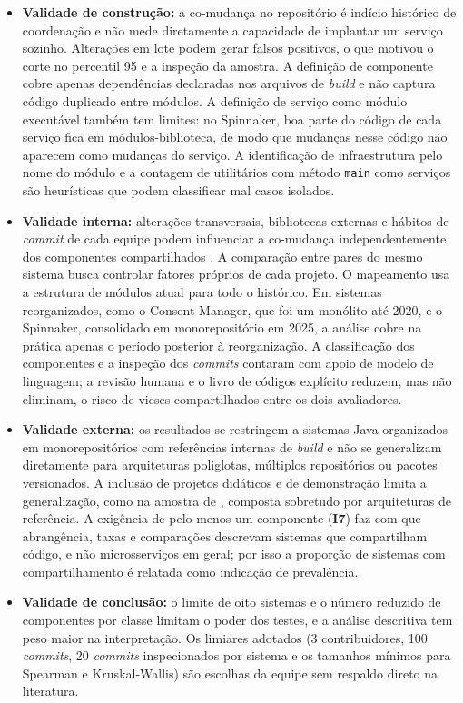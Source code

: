 \begin{itemize}
    \item \textbf{Validade de construção:} a co-mudança no repositório é indício histórico de coordenação e não mede diretamente a capacidade de implantar um serviço sozinho. Alterações em lote podem gerar falsos positivos, o que motivou o corte no percentil 95 e a inspeção da amostra. A definição de componente cobre apenas dependências declaradas nos arquivos de \textit{build} e não captura código duplicado entre módulos. A definição de serviço como módulo executável também tem limites: no Spinnaker, boa parte do código de cada serviço fica em módulos-biblioteca, de modo que mudanças nesse código não aparecem como mudanças do serviço. A identificação de infraestrutura pelo nome do módulo e a contagem de utilitários com método \texttt{main} como serviços são heurísticas que podem classificar mal casos isolados.
    \item \textbf{Validade interna:} alterações transversais, bibliotecas externas e hábitos de \textit{commit} de cada equipe podem influenciar a co-mudança independentemente dos componentes compartilhados \cite{assuncao2023}. A comparação entre pares do mesmo sistema busca controlar fatores próprios de cada projeto. O mapeamento usa a estrutura de módulos atual para todo o histórico. Em sistemas reorganizados, como o Consent Manager, que foi um monólito até 2020, e o Spinnaker, consolidado em monorepositório em 2025, a análise cobre na prática apenas o período posterior à reorganização. A classificação dos componentes e a inspeção dos \textit{commits} contaram com apoio de modelo de linguagem; a revisão humana e o livro de códigos explícito reduzem, mas não eliminam, o risco de vieses compartilhados entre os dois avaliadores.
    \item \textbf{Validade externa:} os resultados se restringem a sistemas Java organizados em monorepositórios com referências internas de \textit{build} e não se generalizam diretamente para arquiteturas poliglotas, múltiplos repositórios ou pacotes versionados. A inclusão de projetos didáticos e de demonstração limita a generalização, como na amostra de , composta sobretudo por arquiteturas de referência. A exigência de pelo menos um componente (\textbf{I7}) faz com que abrangência, taxas e comparações descrevam sistemas que compartilham código, e não microsserviços em geral; por isso a proporção de sistemas com compartilhamento é relatada como indicação de prevalência.
    \item \textbf{Validade de conclusão:} o limite de oito sistemas e o número reduzido de componentes por classe limitam o poder dos testes, e a análise descritiva tem peso maior na interpretação. Os limiares adotados (3 contribuidores, 100 \textit{commits}, 20 \textit{commits} inspecionados por sistema e os tamanhos mínimos para Spearman e Kruskal-Wallis) são escolhas da equipe sem respaldo direto na literatura.
\end{itemize}
